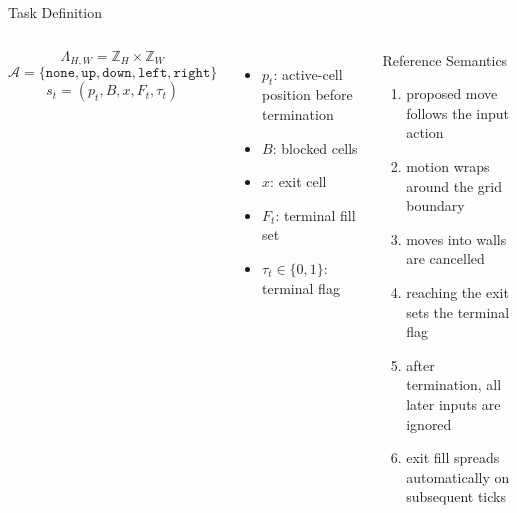 \documentclass[aspectratio=169,11pt]{beamer}
\begin{document}
\begin{frame}{Task Definition}
\begin{columns}[T,totalwidth=\textwidth]
\small
\[
\Lambda_{H,W} = \mathbb{Z}_H \times \mathbb{Z}_W
\]
\[
\mathcal{A} = \{\texttt{none}, \texttt{up}, \texttt{down}, \texttt{left}, \texttt{right}\}
\]
\[
s_t = (p_t, B, x, F_t, \tau_t)
\]
\begin{itemize}
  \item \(p_t\): active-cell position before termination
  \item \(B\): blocked cells
  \item \(x\): exit cell
  \item \(F_t\): terminal fill set
  \item \(\tau_t \in \{0,1\}\): terminal flag
\end{itemize}

\small
\begin{block}{Reference Semantics}
\begin{enumerate}
  \item proposed move follows the input action
  \item motion wraps around the grid boundary
  \item moves into walls are cancelled
  \item reaching the exit sets the terminal flag
  \item after termination, all later inputs are ignored
  \item exit fill spreads automatically on subsequent ticks
\end{enumerate}
\end{block}
\end{columns}
\end{frame}
\end{document}
